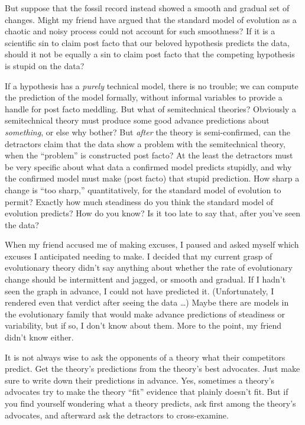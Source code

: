{
 But suppose that the fossil record instead showed a smooth and
gradual set of changes. Might my friend have argued that the standard
model of evolution as a chaotic and noisy process could not account for
such smoothness? If it is a scientific sin to claim post facto that our
beloved hypothesis predicts the data, should it not be equally a sin to
claim post facto that the competing hypothesis is stupid on the data?}

{
 If a hypothesis has a \textit{purely} technical model, there is no
trouble; we can compute the prediction of the model formally, without
informal variables to provide a handle for post facto meddling. But
what of semitechnical theories? Obviously a semitechnical theory must
produce some good advance predictions about \textit{something}, or else
why bother? But \textit{after} the theory is semi-confirmed, can the
detractors claim that the data show a problem with the semitechnical
theory, when the ``problem'' is
constructed post facto? At the least the detractors must be very
specific about what data a confirmed model predicts stupidly, and why
the confirmed model must make (post facto) that stupid prediction. How
sharp a change is ``too sharp,''
quantitatively, for the standard model of evolution to permit? Exactly
how much steadiness do you think the standard model of evolution
predicts? How do you know? Is it too late to say that, after
you've seen the data?}

{
 When my friend accused me of making excuses, I paused and asked
myself which excuses I anticipated needing to make. I decided that my
current grasp of evolutionary theory didn't say
anything about whether the rate of evolutionary change should be
intermittent and jagged, or smooth and gradual. If I
hadn't seen the graph in advance, I could not have
predicted it. (Unfortunately, I rendered even that verdict after seeing
the data \ldots) Maybe there are models in the evolutionary family that
would make advance predictions of steadiness or variability, but if so,
I don't know about them. More to the point, my friend
didn't know either.}

{
 It is not always wise to ask the opponents of a theory what their
competitors predict. Get the theory's predictions from
the theory's best advocates. Just make sure to write
down their predictions in advance. Yes, sometimes a
theory's advocates try to make the theory
``fit'' evidence that plainly
doesn't fit. But if you find yourself wondering what a
theory predicts, ask first among the theory's
advocates, and afterward ask the detractors to cross-examine.}

